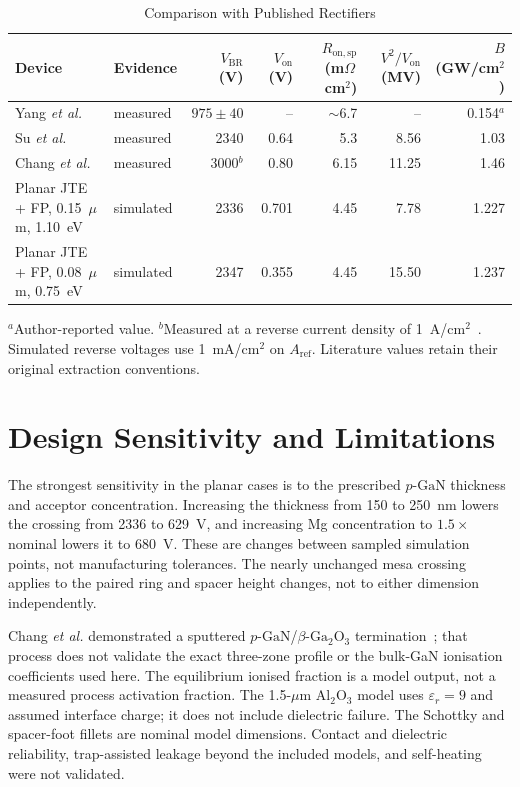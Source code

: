 \documentclass[journal,10pt]{IEEEtran}
\newcommand{\GaO}{\ensuremath{\beta\text{-}\mathrm{Ga}_2\mathrm{O}_3}}
\newcommand{\pGaN}{\ensuremath{p\text{-}\mathrm{GaN}}}
\newcommand{\Ron}{\ensuremath{R_{\mathrm{on,sp}}}}
\begin{document}
\begin{table}[!t]
\caption{Comparison with Published Rectifiers}
\label{tab:literature}
\centering\footnotesize
\begin{tabular}{llrrrrr}
\toprule
Device & Evidence & $V_{\mathrm{BR}}$ (V) & $V_{\mathrm{on}}$ (V) & $\Ron$ (m$\Omega$\,cm$^2$) & $V^2/V_{\mathrm{on}}$ (MV) & $B$ (GW/cm$^2$)\\
\midrule
Yang \emph{et al.}~\cite{Yang2017} & measured & $975\pm40$ & -- & $\sim$6.7 & -- & 0.154$^{a}$\\
Su \emph{et al.}~\cite{Su2024_APL} & measured & 2340 & 0.64 & 5.3 & 8.56 & 1.03\\
Chang \emph{et al.}~\cite{Chang2025_APL} & measured & 3000$^{b}$ & 0.80 & 6.15 & 11.25 & 1.46\\
Planar JTE + FP, 0.15~$\mu$m, 1.10~eV & simulated & 2336 & 0.701 & 4.45 & 7.78 & 1.227\\
Planar JTE + FP, 0.08~$\mu$m, 0.75~eV & simulated & 2347 & 0.355 & 4.45 & 15.50 & 1.237\\
\bottomrule
\end{tabular}
\par\smallskip\begin{minipage}{0.97\textwidth}\footnotesize
$^{a}$Author-reported value. $^{b}$Measured at a reverse current density of 1~A/cm$^2$~\cite{Chang2025_APL}. Simulated reverse voltages use 1~mA/cm$^2$ on $A_{\mathrm{ref}}$. Literature values retain their original extraction conventions.
\end{minipage}
\end{table}

\section{Design Sensitivity and Limitations}
The strongest sensitivity in the planar cases is to the prescribed \pGaN{} thickness and acceptor concentration. Increasing the thickness from 150 to 250~nm lowers the crossing from 2336 to 629~V, and increasing Mg concentration to $1.5\times$ nominal lowers it to 680~V. These are changes between sampled simulation points, not manufacturing tolerances. The nearly unchanged mesa crossing applies to the paired ring and spacer height changes, not to either dimension independently.

Chang \emph{et al.} demonstrated a sputtered \pGaN/\GaO{} termination~\cite{Chang2025_APL}; that process does not validate the exact three-zone profile or the bulk-GaN ionisation coefficients used here. The equilibrium ionised fraction is a model output, not a measured process activation fraction. The 1.5-$\mu$m Al$_2$O$_3$ model uses $\varepsilon_r=9$ and assumed interface charge; it does not include dielectric failure. The Schottky and spacer-foot fillets are nominal model dimensions. Contact and dielectric reliability, trap-assisted leakage beyond the included models, and self-heating were not validated.
\end{document}
